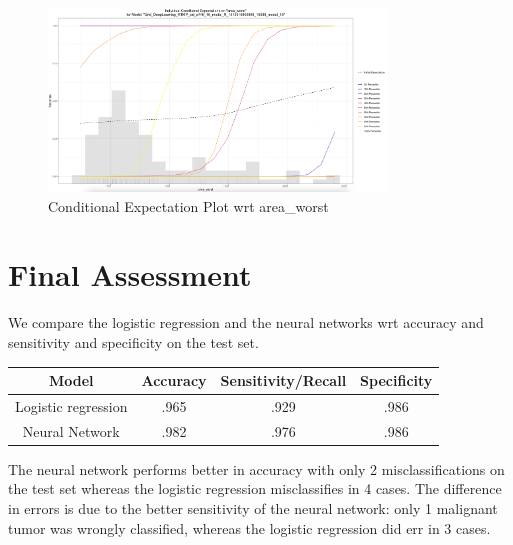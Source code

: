 \documentclass[]{article}
\begin{document}
\begin{figure}
    \centering
    \includegraphics[width=0.8\textwidth]{images/ice_plot.png}
    \caption{Conditional Expectation Plot wrt area\_worst}
    \label{fig:ice_plot}
\end{figure}

\section{Final Assessment}\label{final-assessment}

We compare the logistic regression and the neural networks wrt accuracy
and sensitivity and specificity on the test set.

\begin{center}
 \begin{tabular}{|c | c |  c | c|} 
 \hline
 Model & Accuracy & Sensitivity/Recall & Specificity \\ [0.5ex] 
 \hline
 \hline
 Logistic regression & .965 & .929 & .986 \\ 
 \hline
 Neural Network & .982 & .976 &  .986 \\
 \hline
\end{tabular}
\end{center}

The neural network performs better in accuracy with only 2
misclassifications on the test set whereas the logistic regression
misclassifies in 4 cases. The difference in errors is due to the better
sensitivity of the neural network: only 1 malignant tumor was wrongly
classified, whereas the logistic regression did err in 3 cases.
\end{document}

